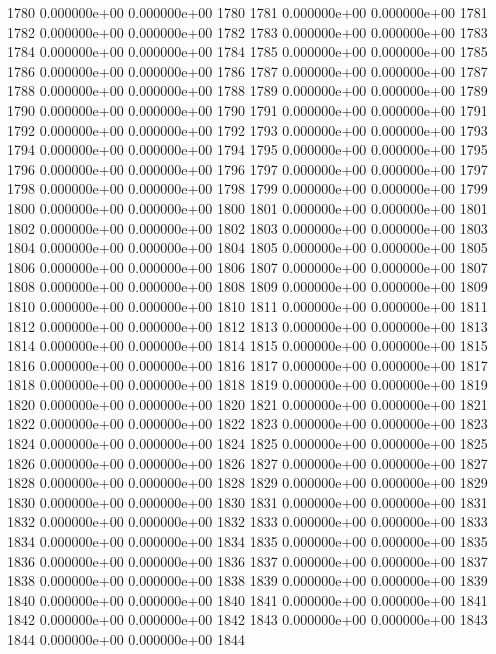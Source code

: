\documentclass{article}
\begin{document}
\begin{Schunk}
\begin{Soutput}
1780   0.000000e+00   0.000000e+00 1780
1781   0.000000e+00   0.000000e+00 1781
1782   0.000000e+00   0.000000e+00 1782
1783   0.000000e+00   0.000000e+00 1783
1784   0.000000e+00   0.000000e+00 1784
1785   0.000000e+00   0.000000e+00 1785
1786   0.000000e+00   0.000000e+00 1786
1787   0.000000e+00   0.000000e+00 1787
1788   0.000000e+00   0.000000e+00 1788
1789   0.000000e+00   0.000000e+00 1789
1790   0.000000e+00   0.000000e+00 1790
1791   0.000000e+00   0.000000e+00 1791
1792   0.000000e+00   0.000000e+00 1792
1793   0.000000e+00   0.000000e+00 1793
1794   0.000000e+00   0.000000e+00 1794
1795   0.000000e+00   0.000000e+00 1795
1796   0.000000e+00   0.000000e+00 1796
1797   0.000000e+00   0.000000e+00 1797
1798   0.000000e+00   0.000000e+00 1798
1799   0.000000e+00   0.000000e+00 1799
1800   0.000000e+00   0.000000e+00 1800
1801   0.000000e+00   0.000000e+00 1801
1802   0.000000e+00   0.000000e+00 1802
1803   0.000000e+00   0.000000e+00 1803
1804   0.000000e+00   0.000000e+00 1804
1805   0.000000e+00   0.000000e+00 1805
1806   0.000000e+00   0.000000e+00 1806
1807   0.000000e+00   0.000000e+00 1807
1808   0.000000e+00   0.000000e+00 1808
1809   0.000000e+00   0.000000e+00 1809
1810   0.000000e+00   0.000000e+00 1810
1811   0.000000e+00   0.000000e+00 1811
1812   0.000000e+00   0.000000e+00 1812
1813   0.000000e+00   0.000000e+00 1813
1814   0.000000e+00   0.000000e+00 1814
1815   0.000000e+00   0.000000e+00 1815
1816   0.000000e+00   0.000000e+00 1816
1817   0.000000e+00   0.000000e+00 1817
1818   0.000000e+00   0.000000e+00 1818
1819   0.000000e+00   0.000000e+00 1819
1820   0.000000e+00   0.000000e+00 1820
1821   0.000000e+00   0.000000e+00 1821
1822   0.000000e+00   0.000000e+00 1822
1823   0.000000e+00   0.000000e+00 1823
1824   0.000000e+00   0.000000e+00 1824
1825   0.000000e+00   0.000000e+00 1825
1826   0.000000e+00   0.000000e+00 1826
1827   0.000000e+00   0.000000e+00 1827
1828   0.000000e+00   0.000000e+00 1828
1829   0.000000e+00   0.000000e+00 1829
1830   0.000000e+00   0.000000e+00 1830
1831   0.000000e+00   0.000000e+00 1831
1832   0.000000e+00   0.000000e+00 1832
1833   0.000000e+00   0.000000e+00 1833
1834   0.000000e+00   0.000000e+00 1834
1835   0.000000e+00   0.000000e+00 1835
1836   0.000000e+00   0.000000e+00 1836
1837   0.000000e+00   0.000000e+00 1837
1838   0.000000e+00   0.000000e+00 1838
1839   0.000000e+00   0.000000e+00 1839
1840   0.000000e+00   0.000000e+00 1840
1841   0.000000e+00   0.000000e+00 1841
1842   0.000000e+00   0.000000e+00 1842
1843   0.000000e+00   0.000000e+00 1843
1844   0.000000e+00   0.000000e+00 1844

\end{Soutput}
\end{Schunk}
\end{document}
